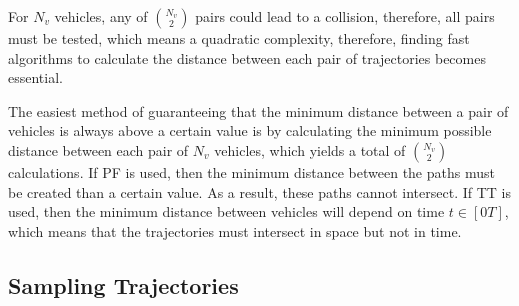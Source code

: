 \par For $N_v$ vehicles, any of ${N_v \choose 2}$ pairs could lead to a collision, therefore, all pairs must be tested, which means a quadratic complexity, therefore, finding fast algorithms to calculate the distance between each pair of trajectories becomes essential.
\par The easiest method of guaranteeing that the minimum distance between a pair of vehicles is always above a certain value is by calculating the minimum possible distance between each pair of $N_v$ vehicles, which yields a total of ${N_v \choose 2}$ calculations. If \ac{PF} is used, then the minimum distance between the paths must be created than a certain value. As a result, these paths cannot intersect. If \ac{TT} is used, then the minimum distance between vehicles will depend on time $t \in [0 T]$, which means that the trajectories must intersect in space but not in time. 

\subsection{Sampling Trajectories}


